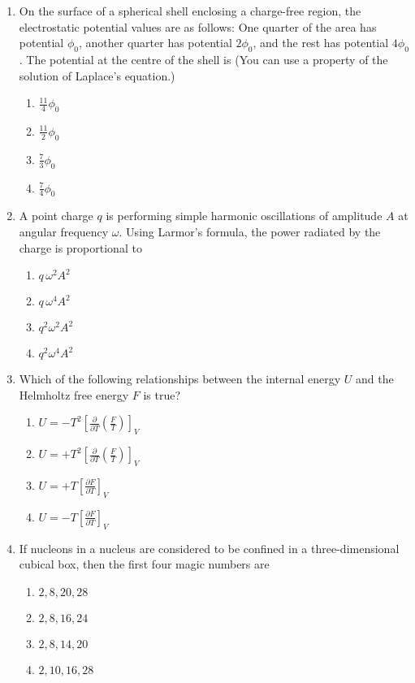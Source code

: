 \documentclass[journal,12pt,onecolumn]{IEEEtran}
\theoremstyle{remark}
\begin{document}
\begin{enumerate}
    \item On the surface of a spherical shell enclosing a charge-free region, the electrostatic potential values are as follows: One quarter of the area has potential $\phi_0$, another quarter has potential $2\phi_0$, and the rest has potential $4\phi_0$. The potential at the centre of the shell is
    (You can use a property of the solution of Laplace's equation.)
    \begin{enumerate}
        \item $\frac{11}{4} \phi_0$
        \item $\frac{11}{2} \phi_0$
        \item $\frac{7}{3} \phi_0$
        \item $\frac{7}{4} \phi_0$
    \end{enumerate}
    \item A point charge $q$ is performing simple harmonic oscillations of amplitude $A$ at angular frequency $\omega$. Using Larmor's formula, the power radiated by the charge is proportional to
\begin{enumerate}
    \item $q \, \omega^2 A^2$
    \item $q \, \omega^4 A^2$
    \item $q^2 \omega^2 A^2$
    \item $q^2 \omega^4 A^2$
\end{enumerate}
\item Which of the following relationships between the internal energy $U$ and the Helmholtz free energy $F$ is true?
\begin{enumerate}
    \item $U = -T^2 \left[ \frac{\partial}{\partial T} \left( \frac{F}{T} \right) \right]_V$
    \item $U = +T^2 \left[ \frac{\partial}{\partial T} \left( \frac{F}{T} \right) \right]_V$
    \item $U = +T \left[ \frac{\partial F}{\partial T} \right]_V$
    \item $U = -T \left[ \frac{\partial F}{\partial T} \right]_V$
\end{enumerate}
\item If nucleons in a nucleus are considered to be confined in a three-dimensional cubical box, then the first four magic numbers are
\begin{enumerate}
    \item$2, 8, 20, 28$
    \item $2, 8, 16, 24$
    \item $2, 8, 14, 20$
    \item $2, 10, 16, 28$
\end{enumerate}


\end{enumerate}
\end{document}
